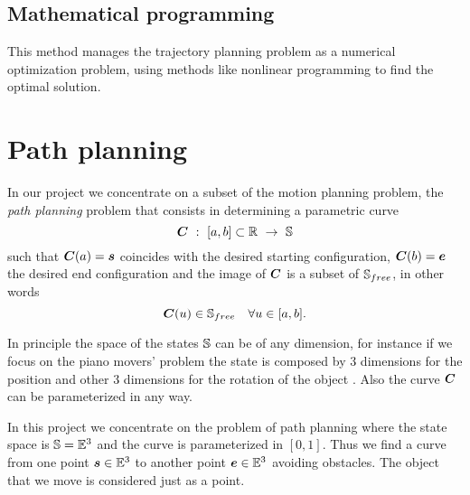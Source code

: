 \documentclass[dissertation.tex]{subfiles}
\begin{document}
\subsection{Mathematical programming}
This method manages the trajectory planning problem as a numerical
optimization problem, using methods like nonlinear programming to
find the optimal solution.

\section{Path planning}
In our project we concentrate on a subset of the motion planning
problem, the \emph{path planning} problem that consists \cite{choset}
in determining a parametric curve
\begin{equation*}
  \ve{C}\ :\ [a,b]\subset\mR\ \rightarrow\ \mS
\end{equation*}
such that $\boldsymbol{C}(a)=\boldsymbol{s}$ coincides with the desired starting
configuration,
$\boldsymbol{C}(b)=\boldsymbol{e}$ the desired end configuration and the image of
$\boldsymbol{C}$ is a
subset of $\mathbb{S}_{free}$, in other words
\begin{equation*}
\boldsymbol{C}(u)\in\mathbb{S}_{free}\quad \forall u\in[a,b].
\end{equation*}

In principle the space of the states $\mathbb{S}$ can be of any dimension,
for instance if we focus on the piano movers' problem the state is
composed by 3 dimensions for the position and other 3 dimensions for
the rotation of the object \cite{lavalle}. Also
the curve $\boldsymbol{C}$ can be parameterized in any way. 

In this project we
concentrate on the problem of
path planning where the state space is $\mathbb{S}=\mathbb{E}^3$ and the curve is
parameterized in $[0,1]$. Thus we find a curve from one point
$\boldsymbol{s}\in\mathbb{E}^3$ to another point $\boldsymbol{e}\in\mathbb{E}^3$ 
avoiding obstacles. The object that we move is considered just as a
point.
\end{document}
